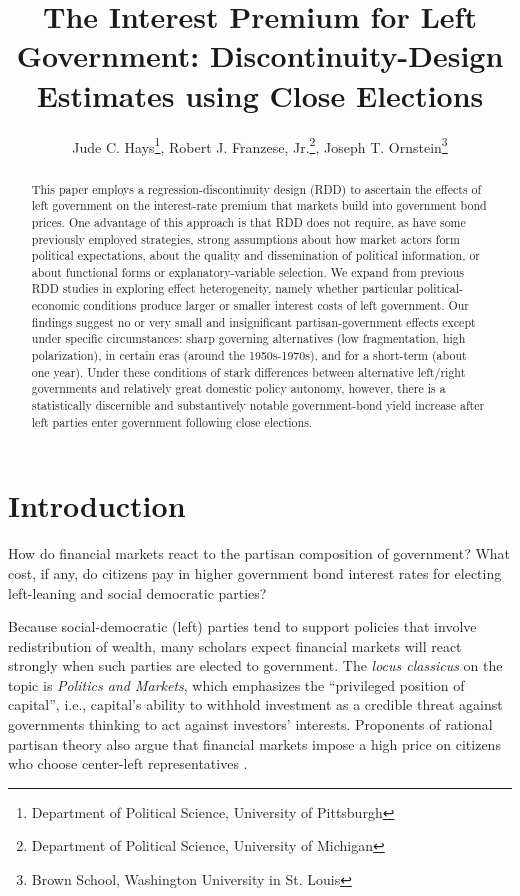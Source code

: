\documentclass[12pt]{article}
\author{Jude C. Hays\footnote{Department of Political Science, University of Pittsburgh}, Robert J. Franzese, Jr.\footnote{Department of Political Science, University of Michigan}, Joseph T. Ornstein\footnote{Brown School, Washington University in St. Louis}}
\title{The Interest Premium for Left Government:
Discontinuity-Design Estimates using Close Elections}
\begin{document}
\singlespacing
\maketitle
\doublespacing

\begin{abstract} 
\noindent This paper employs a regression-discontinuity design (RDD) to ascertain the effects of left government on the interest-rate premium that markets build into government bond prices. One advantage of this approach is that RDD does not require, as have some previously employed strategies, strong assumptions about how market actors form political expectations, about the quality and dissemination of political information, or about functional forms or explanatory-variable selection. We expand from previous RDD studies in exploring effect heterogeneity, namely whether particular political-economic conditions produce larger or smaller interest costs of left government. Our findings suggest no or very small and insignificant partisan-government effects except under specific circumstances: sharp governing alternatives (low fragmentation, high polarization), in certain eras (around the 1950s-1970s), and for a short-term (about one year). Under these conditions of stark differences between alternative left/right governments and relatively great domestic policy autonomy, however, there is a statistically discernible and substantively notable government-bond yield increase after left parties enter government following close elections.

\end{abstract}

\pagebreak

\section{Introduction}

How do financial markets react to the partisan composition of government? What cost, if any, do citizens pay in higher government bond interest rates for electing left-leaning and social democratic parties? 

Because social-democratic (left) parties tend to support policies that involve redistribution of wealth, many scholars expect financial markets will react strongly when such parties are elected to government. The \textit{locus classicus} on the topic is \citet{Lindblom1977} \textit{Politics and Markets}, which emphasizes the ``privileged position of capital'', i.e., capital's ability to withhold investment as a credible threat against governments thinking to act against investors' interests. Proponents of rational partisan theory also argue that financial markets impose a high price on citizens who choose center-left representatives \citep{Alesina1997, Herron2000, fowler2006elections, bechtel2009political, sattler2013markets,barta2018rating}. 
\end{document}
